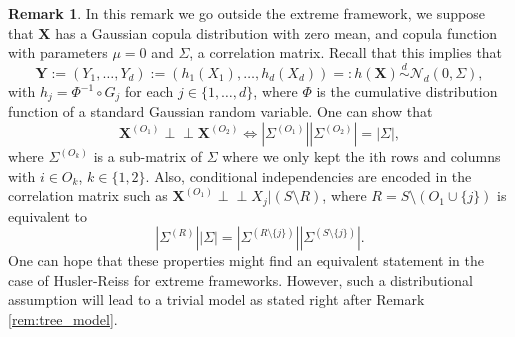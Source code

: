 \documentclass[11pt]{article}
\theoremstyle{definition}
\newtheorem{remark}{Remark}
\newcommand{\indep}{\perp \!\!\! \perp}
\begin{document}
	\begin{remark}
		 \label{rem:gaussian_copula}
		 In this remark we go outside the extreme framework, we suppose that $\textbf{X}$ has a Gaussian copula distribution with zero mean, and copula function with parameters $\mu = 0$ and $\Sigma$, a correlation matrix. Recall that this implies that
		 \begin{equation*}
		 	\textbf{Y} := (Y_1, \dots, Y_d) := (h_1(X_1), \dots, h_d(X_d)) =: h(\textbf{X}) \overset{d}{\sim} \mathcal{N}_d(0, \Sigma),
		 \end{equation*}
		 with $h_j = \Phi^{-1} \circ G_j$ for each $j \in \{1,\dots,d\}$, where $\Phi$ is the cumulative distribution function of a standard Gaussian random variable. One can show that
		 \begin{equation*}
		 	\textbf{X}^{(O_1)} \indep \textbf{X}^{(O_2)} \Longleftrightarrow  |\Sigma^{(O_1)}| |\Sigma^{(O_2)}| = |\Sigma|,
		 \end{equation*}
		 where $\Sigma^{(O_k)}$ is a sub-matrix of $\Sigma$ where we only kept the ith rows and columns with $i \in O_k$, $k \in \{1,2\}$. Also, conditional independencies are encoded in the correlation matrix such as $\textbf{X}^{(O_1)} \indep X_j | (S \setminus R)$, where $R = S \setminus (O_1 \cup \{j\})$ is equivalent to
		 \begin{equation*}
		 	|\Sigma^{(R)}| |\Sigma| = |\Sigma^{(R \setminus \{j\})}| |\Sigma^{(S \setminus \{j\})}|.
		 \end{equation*}
		 One can hope that these properties might find an equivalent statement in the case of Husler-Reiss for extreme frameworks. However, such a distributional assumption will lead to a trivial model as stated right after Remark \ref{rem:tree_model}.
	\end{remark}
	
\end{document}
